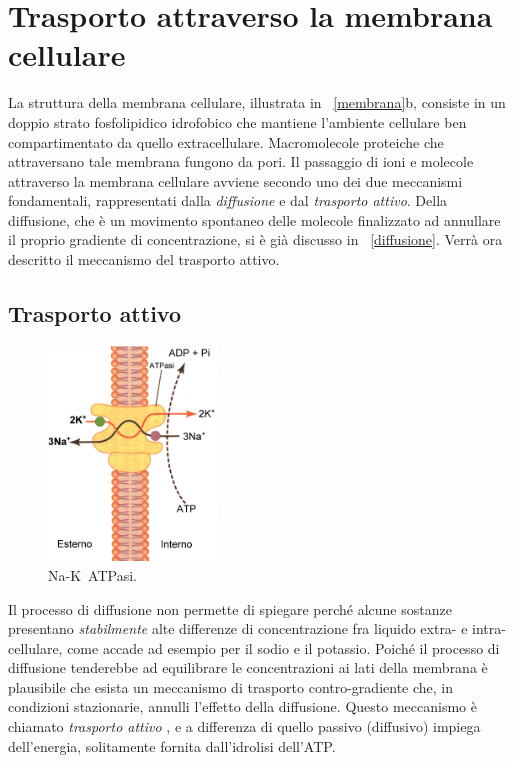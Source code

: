 \section{Trasporto attraverso la membrana cellulare}\label{trasp_cel}

La struttura della membrana cellulare, illustrata in \figurename~\ref{membrana}b, consiste in un doppio strato fosfolipidico idrofobico che mantiene l'ambiente cellulare ben compartimentato da quello extracellulare. Macromolecole proteiche che attraversano tale membrana fungono da pori. Il passaggio di ioni e molecole attraverso la membrana cellulare avviene secondo uno dei due meccanismi fondamentali, rappresentati dalla \textit{diffusione} e dal \textit{trasporto attivo}. Della diffusione, che è un movimento spontaneo delle molecole finalizzato ad annullare il proprio gradiente di concentrazione, si è già discusso in \textsection~\ref{diffusione}. Verrà ora descritto il meccanismo del trasporto attivo.

\subsection{Trasporto attivo}

\begin{figure}
  \begin{center}
    \includegraphics[width=0.4\textwidth]{immagini/atpase.eps}
  \end{center}
  \caption{Na-K~ATPasi.}\label{NaKasi}
\end{figure}

Il processo di diffusione non permette di spiegare perché alcune sostanze presentano \textit{stabilmente} alte differenze di concentrazione fra liquido extra- e intra-cellulare, come accade ad esempio per il sodio e il potassio. Poiché il processo di diffusione tenderebbe ad equilibrare le concentrazioni ai lati della membrana è plausibile che esista un meccanismo di trasporto contro-gradiente che, in condizioni stazionarie, annulli l'effetto della diffusione. Questo meccanismo è chiamato \textit{trasporto attivo} \cite{guyton}, e a differenza di quello passivo (diffusivo) impiega dell'energia, solitamente fornita dall'idrolisi dell'ATP.

